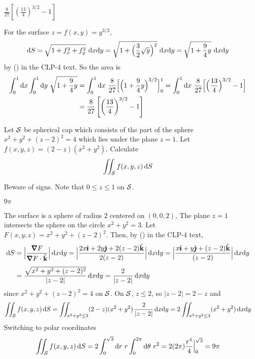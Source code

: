 \begin{answer} 
$\frac{8}{27}\left[\left(\frac{13}{4}\right)^{3/2}-1\right]$
\end{answer}


\begin{solution}
For the surface $z=f(x,y)=y^{3/2}$,
$$
\dee{S}=\sqrt{1+f_x^2+f_y^2}\ \dee{x}\dee{y}
=\sqrt{1+\Big(\frac{3}{2}\sqrt{y}\Big)^2}\ \dee{x}\dee{y}
=\sqrt{1+\frac{9}{4}y}\ \dee{x}\dee{y}
$$
by () in the CLP-4 text.
So the area is
\begin{align*}
\int_0^1\dee{x}\int_0^1\dee{y}\ \sqrt{1+\frac{9}{4}y}
&=\int_0^1\dee{x}\ \frac{8}{27}\Big[\Big(1+\frac{9}{4}y\Big)^{3/2}\Big]_0^1
=\int_0^1\dee{x}\ \frac{8}{27}\Big[\Big(\frac{13}{4}\Big)^{3/2}-1\Big] \\
&=\frac{8}{27}\left[\left(\frac{13}{4}\right)^{3/2}-1\right]
\end{align*}
\end{solution}

\begin{question}[M317 1998D] %
 Let $\mathcal{S}$ be spherical cap which consists of the part of
the sphere $x^2+y^2+(z-2)^2=4$ which lies under the plane $z=1$. Let 
$f(x,y,z)=(2-z)(x^2+y^2)$. Calculate
$$
\iint_{\mathcal{S}} f(x,y,z)\,\mathrm{d}S
$$

\end{question}

\begin{hint} 
Beware of signs. Note that $0\le z\le 1$ on $\mathcal{S}$.
\end{hint}

\begin{answer} 
$9\pi$
\end{answer}

\begin{solution} 
The surface is a sphere of radius $2$ centered on $(0,0,2)$,
The plane $z=1$ intersects the sphere on the circle $x^2+y^2=3$.
Let $F(x,y,z)=x^2+y^2+(z-2)^2$. Then, by ()
in the CLP-4 text,
\begin{align*}
\dee{S}&=\Big|\frac{\vnabla F}{\vnabla F\cdot\hk}\Big|\,\dee{x}\dee{y}
=\Big|\frac{2x\hi+2y\hj+2(z-2)\hk}{2(z-2)}\Big|\,\dee{x}\dee{y}
=\Big|\frac{x\hi+y\hj+(z-2)\hk}{(z-2)}\Big|\,\dee{x}\dee{y} \\[0.05in]
&=\frac{\sqrt{x^2+y^2+(z-2)^2}}{|z-2|}\,\dee{x}\dee{y} 
=\frac{2}{|z-2|}\,\dee{x}\dee{y}
\end{align*}
since $x^2+y^2+(z-2)^2=4$ on $\mathcal{S}$. On $\mathcal{S}$, $z\le 2$, so
$|z-2|=2-z$ and
$$
\iint_{\mathcal{S}} f(x,y,z)\,\mathrm{d}S
=\iint_{x^2+y^2\le 3} (2-z)(x^2+y^2)\,\frac{2}{|z-2|}\,\mathrm{d}x\mathrm{d}y
=2\iint_{x^2+y^2\le 3} (x^2+y^2)\,\mathrm{d}x\mathrm{d}y
$$
Switching to polar coordinates
$$
\iint_{\mathcal{S}} f(x,y,z)\,\mathrm{d}S
=2\int_0^{\sqrt{3}}\mathrm{d}r\ r\int_0^{2\pi}\mathrm{d}\theta\  r^2
=2(2\pi)\frac{r^4}{4}\Big|_0^{\sqrt{3}}
=9\pi
$$
\end{solution}

